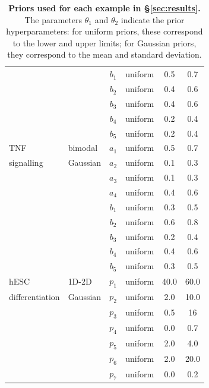 \begin{table}[H]
\begin{adjustwidth}{0in}{0in}
\begin{tabularx}{1.0\textwidth}{llclcc}
&& $b_1$ & uniform & 0.5 & 0.7\\
&& $b_2$ & uniform & 0.4 & 0.6\\
&& $b_3$ & uniform & 0.4 & 0.6\\
&& $b_4$ & uniform & 0.2 & 0.4\\
&& $b_5$ & uniform & 0.2 & 0.4\\
\toprule
TNF  & bimodal  & $a_1$ & uniform & 0.5 & 0.7\\
signalling& Gaussian & $a_2$ & uniform & 0.1 & 0.3\\
&& $a_3$ & uniform & 0.1 & 0.3\\
&& $a_4$ & uniform & 0.4 & 0.6\\
&& $b_1$ & uniform & 0.3 & 0.5\\
&& $b_2$ & uniform & 0.6 & 0.8\\
&& $b_3$ & uniform & 0.2 & 0.4\\
&& $b_4$ & uniform & 0.4 & 0.6\\
&& $b_5$ & uniform & 0.3 & 0.5\\
\toprule
hESC & 1D-2D & $p_1$ & uniform & 40.0 & 60.0\\
differentiation & Gaussian & $p_2$ & uniform & 2.0 & 10.0\\
&& $p_3$ & uniform & 0.5 & 16\\
&& $p_4$ & uniform & 0.0 & 0.7\\
&& $p_5$ & uniform & 2.0 & 4.0\\
&& $p_6$ & uniform & 2.0 & 20.0\\
&& $p_7$ & uniform & 0.0 & 0.2\\
\end{tabularx}
\caption{\textbf{Priors used for each example in \S\ref{sec:results}.} The parameters $\theta_1$ and $\theta_2$ indicate the prior hyperparameters: for uniform priors, these correspond to the lower and upper limits; for Gaussian priors, they correspond to the mean and standard deviation.}
\label{tab:priors}
\end{adjustwidth}
\end{table}

